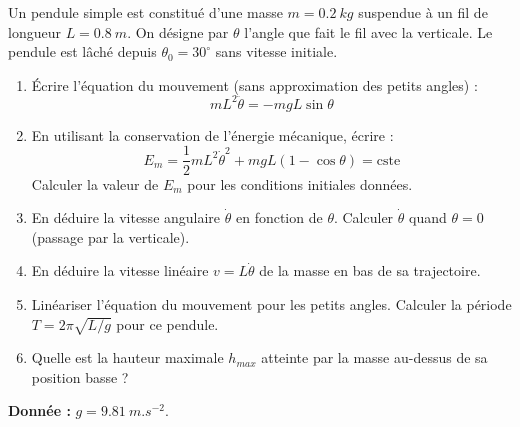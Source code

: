 \documentclass[12pt,a4paper]{article}
\begin{document}
\begin{boiteexercice}
Un pendule simple est constitué d'une masse $m = \qty{0.2}{kg}$ suspendue à un fil de longueur $L = \qty{0.8}{m}$. On désigne par $\theta$ l'angle que fait le fil avec la verticale. Le pendule est lâché depuis $\theta_0 = 30^\circ $ sans vitesse initiale.

\begin{center}
\end{center}

\begin{enumerate}
  \item Écrire l'équation du mouvement (sans approximation des petits angles) :
  \[
  mL^2\ddot{\theta} = -mgL\sin\theta
  \]
  \item En utilisant la conservation de l'énergie mécanique, écrire :
  \[
  E_m = \frac{1}{2}mL^2\dot{\theta}^2 + mgL(1-\cos\theta) = \text{cste}
  \]
  Calculer la valeur de $E_m$ pour les conditions initiales données.
  \item En déduire la vitesse angulaire $\dot{\theta}$ en fonction de $\theta$. Calculer $\dot{\theta}$ quand $\theta = 0$ (passage par la verticale).
  \item En déduire la vitesse linéaire $v = L\dot{\theta}$ de la masse en bas de sa trajectoire.
  \item Linéariser l'équation du mouvement pour les petits angles. Calculer la période $T = 2\pi\sqrt{L/g}$ pour ce pendule.
  \item Quelle est la hauteur maximale $h_{max}$ atteinte par la masse au-dessus de sa position basse ?
\end{enumerate}
\textbf{Donnée :} $g = \qty{9.81}{m.s^{-2}}$.
\end{boiteexercice}
\end{document}
